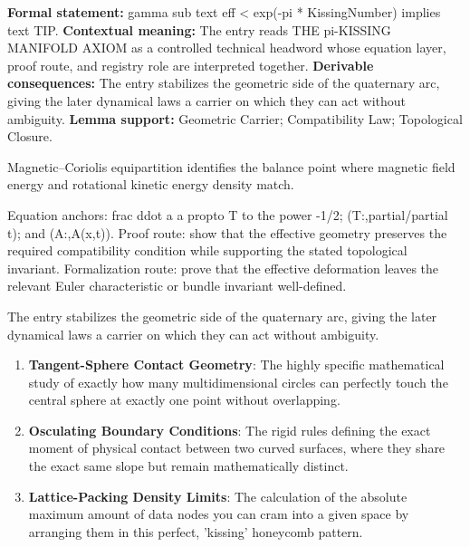 \begingroup\footnotesize\setlength{\emergencystretch}{3em}\sloppy
\textbf{Formal statement:} gamma sub text eff < exp(-pi * KissingNumber) implies text TIP. \textbf{Contextual meaning:} The entry reads THE pi-KISSING MANIFOLD AXIOM as a controlled technical headword whose equation layer, proof route, and registry role are interpreted together. \textbf{Derivable consequences:} The entry stabilizes the geometric side of the quaternary arc, giving the later dynamical laws a carrier on which they can act without ambiguity. \textbf{Lemma support:} Geometric Carrier; Compatibility Law; Topological Closure.\par
\endgroup

Magnetic--Coriolis equipartition identifies the balance point where magnetic field energy and rotational kinetic energy density match.

Equation anchors: frac ddot a a propto T to the power -1/2; (T:,partial/partial t); and (A:,A(x,t)). Proof route: show that the effective geometry preserves the required compatibility condition while supporting the stated topological invariant. Formalization route: prove that the effective deformation leaves the relevant Euler characteristic or bundle invariant well-defined.

The entry stabilizes the geometric side of the quaternary arc, giving the later dynamical laws a carrier on which they can act without ambiguity.
\endgroup

\begin{enumerate}[leftmargin=1.6em,itemsep=6pt,topsep=4pt]
\item \textbf{Tangent-Sphere Contact Geometry}: The highly specific mathematical study of exactly how many multidimensional circles can perfectly touch the central sphere at exactly one point without overlapping.
\item \textbf{Osculating Boundary Conditions}: The rigid rules defining the exact moment of physical contact between two curved surfaces, where they share the exact same slope but remain mathematically distinct.
\item \textbf{Lattice-Packing Density Limits}: The calculation of the absolute maximum amount of data nodes you can cram into a given space by arranging them in this perfect, 'kissing' honeycomb pattern.
\end{enumerate}


